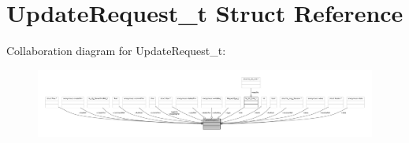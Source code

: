 \hypertarget{struct_update_request__t}{}\section{Update\+Request\+\_\+t Struct Reference}
\label{struct_update_request__t}


Collaboration diagram for Update\+Request\+\_\+t\+:
\nopagebreak
\begin{figure}[H]
\begin{center}
\leavevmode
\includegraphics[width=350pt]{struct_update_request__t__coll__graph}
\end{center}
\end{figure}
